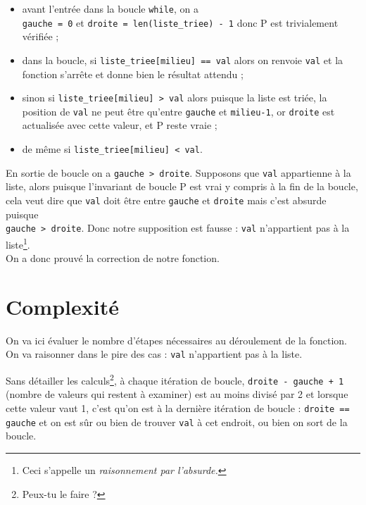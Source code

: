 \begin{itemize}
	\item 	avant l'entrée dans la boucle \texttt{while}, on a\\
	      \texttt{gauche = 0} et \texttt{droite = len(liste_triee) - 1} donc P est trivialement vérifiée ;
	\item 	dans la boucle, si  \texttt{liste_triee[milieu] == val} alors on renvoie \texttt{val} et la fonction s'arrête et donne bien le résultat attendu ;
	\item   sinon si \texttt{liste_triee[milieu] > val} alors puisque la liste est triée, la position de \texttt{val} ne peut être qu'entre \texttt{gauche} et \texttt{milieu-1}, or \texttt{droite} est actualisée avec cette valeur, et P reste vraie ;
	\item 	de même si \texttt{liste_triee[milieu] < val}.
\end{itemize}
En sortie de boucle on a \texttt{gauche > droite}. Supposons que \texttt{val} appartienne à la liste, alors puisque l'invariant de boucle P est vrai y compris à la fin de la boucle, cela veut dire que \texttt{val} doit être entre \texttt{gauche} et \texttt{droite} mais c'est absurde puisque\\  \texttt{gauche > droite}. Donc notre supposition est fausse : \texttt{val} n'appartient pas à la liste\footnote{Ceci s'appelle un \textit{raisonnement par l'absurde.}}.\\

On a donc prouvé la correction de notre fonction.

\section{Complexité}

On va ici évaluer le nombre d'étapes nécessaires au déroulement de la fonction. On va raisonner dans le pire des cas : \texttt{val} n'appartient pas à la liste.

Sans détailler les calculs\footnote{Peux-tu le faire ?}, à chaque itération de boucle, \texttt{droite - gauche + 1} (nombre de valeurs qui restent à examiner) est au moins divisé par 2 et lorsque  cette valeur vaut 1, c'est qu'on est à la dernière itération de boucle : \texttt{droite == gauche} et on est sûr ou bien de trouver \texttt{val} à cet endroit, ou bien on sort de la boucle.\\

